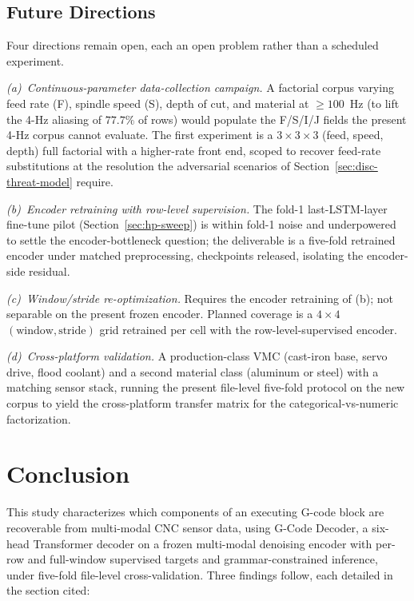 \documentclass[sensors,article,submit,moreauthors,pdftex]{Definitions/mdpi}
\newcommand{\modelname}{G-Code Decoder}
\begin{document}
\subsection{Future Directions}
\label{sec:roadmap}

Four directions remain open, each an open problem rather than a scheduled experiment.

\emph{(a)~Continuous-parameter data-collection campaign.} A factorial corpus varying feed rate (F), spindle speed (S), depth of cut, and material at $\geq\!100$~Hz (to lift the 4-Hz aliasing of $77.7\%$ of rows) would populate the F/S/I/J fields the present 4-Hz corpus cannot evaluate. The first experiment is a $3\!\times\!3\!\times\!3$ (feed, speed, depth) full factorial with a higher-rate front end, scoped to recover feed-rate substitutions at the resolution the adversarial scenarios of Section~\ref{sec:disc-threat-model} require.

\emph{(b)~Encoder retraining with row-level supervision.} The fold-1 last-LSTM-layer fine-tune pilot (Section~\ref{sec:hp-sweep}) is within fold-1 noise and underpowered to settle the encoder-bottleneck question; the deliverable is a five-fold retrained encoder under matched preprocessing, checkpoints released, isolating the encoder-side residual.

\emph{(c)~Window/stride re-optimization.} Requires the encoder retraining of (b); not separable on the present frozen encoder. Planned coverage is a $4\!\times\!4$ $(\text{window}, \text{stride})$ grid retrained per cell with the row-level-supervised encoder.

\emph{(d)~Cross-platform validation.} A production-class VMC (cast-iron base, servo drive, flood coolant) and a second material class (aluminum or steel) with a matching sensor stack, running the present file-level five-fold protocol on the new corpus to yield the cross-platform transfer matrix for the categorical-vs-numeric factorization.

\section{Conclusion}
\label{sec:conclusion}

This study characterizes which components of an executing G-code block are recoverable from multi-modal CNC sensor data, using \modelname{}, a six-head Transformer decoder on a frozen multi-modal denoising encoder with per-row and full-window supervised targets and grammar-constrained inference, under five-fold file-level cross-validation. Three findings follow, each detailed in the section cited:
\end{document}
